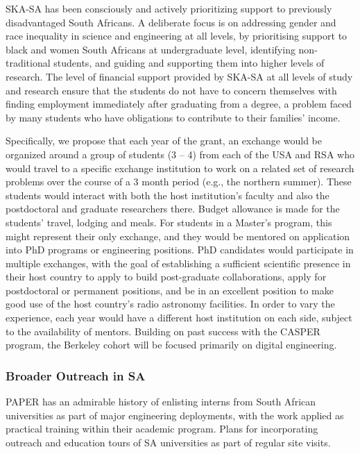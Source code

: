 \documentclass[preprint]{aastex}
\begin{document}
SKA-SA has been consciously and actively prioritizing support to previously disadvantaged South Africans.  A deliberate focus is on addressing gender and race inequality in science and engineering at all levels, by prioritising support to black and women South Africans at undergraduate level, identifying non-traditional students, and guiding and supporting them into higher levels of research.  The level of financial support provided by SKA-SA at all levels of study and research ensure that the students do not have to concern themselves with finding employment immediately after graduating from a degree, a problem faced by many students who have obligations to contribute to their families’ income.

Specifically, we propose that each year of the grant, an exchange would be organized around a group of students (3 – 4) from each of the USA and RSA who would travel to a specific exchange institution to work on a related set of research problems over the course of a 3 month period (e.g., the northern summer).  These students would interact with both the host institution’s faculty and also the postdoctoral and graduate researchers there.  Budget allowance is made for the students' travel, lodging and meals.  For students in a Master’s program, this might represent their only exchange, and they would be mentored on application into PhD programs or engineering positions.  PhD candidates would participate in multiple exchanges, with the goal of establishing a sufficient scientific presence in their host country to apply to build post-graduate collaborations, apply for postdoctoral or permanent positions, and be in an excellent position to make good use of the host country’s radio astronomy facilities.  In order to vary the experience, each year would have a different host institution on each side, subject to the availability of mentors.  Building on past success with the CASPER program, the Berkeley cohort will be focused primarily on digital engineering.  

\subsubsection{Broader Outreach in SA}

PAPER has an admirable history of enlisting interns from South African universities as part of major engineering deployments, with the work applied as practical training within their academic program.
Plans for incorporating outreach and education tours of SA universities as part of regular site visits.
\end{document}
